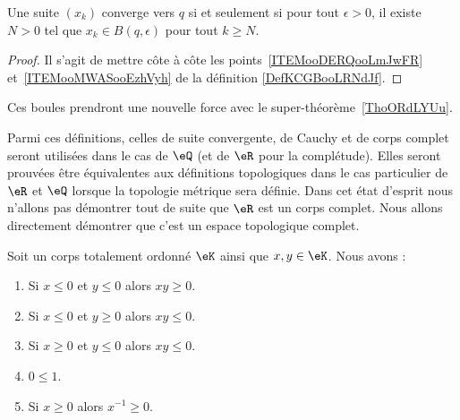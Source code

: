 \begin{lemma}
	Une suite \( (x_k)\) converge vers \( q\) si et seulement si pour tout \( \epsilon>0\), il existe \( N>0\) tel que \( x_k\in B(q,\epsilon)\) pour tout \( k\geq N\).
\end{lemma}

\begin{proof}
	Il s'agit de mettre côte à côte les points~\ref{ITEMooDERQooLmJwFR} et~\ref{ITEMooMWASooEzhVyh} de la définition \ref{DefKCGBooLRNdJf}.
\end{proof}

\begin{normaltext}
	Ces boules prendront une nouvelle force avec le super-théorème~\ref{ThoORdLYUu}.
\end{normaltext}

Parmi ces définitions, celles de suite convergente, de Cauchy et de corps complet seront utilisées dans le cas de \( \eQ\) (et de \( \eR\) pour la complétude). Elles seront prouvées être équivalentes aux définitions topologiques dans le cas particulier de \( \eR\) et \( \eQ\) lorsque la topologie métrique sera définie. Dans cet état d'esprit nous n'allons pas démontrer tout de suite que \( \eR\) est un corps complet. Nous allons directement démontrer que c'est un espace topologique complet.

\begin{lemma}        \label{LEMooXJTAooZauchx}
	Soit un corps totalement ordonné \( \eK\) ainsi que \( x,y\in \eK\). Nous avons :
	\begin{enumerate}
		\item
		      Si \( x\leq 0\) et \( y\leq 0\) alors \( xy\geq 0\).
		\item
		      Si \( x\leq 0\) et \( y\geq 0\) alors \( xy\leq 0\).
		\item
		      Si \( x\geq 0\) et \( y\leq 0\) alors \( xy\leq 0\).
		\item       \label{ITEMooRGYAooCUIfss}
		      \( 0\leq 1\).
		\item       \label{ITEMooMRNHooLglPKn}
		      Si \( x\geq 0\) alors \( x^{-1}\geq 0\).
	\end{enumerate}
\end{lemma}

